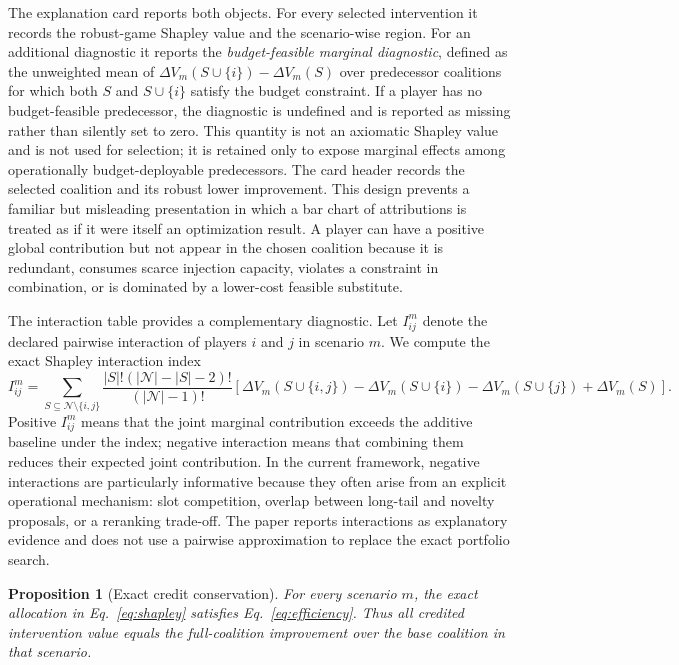 \documentclass[pdflatex,sn-mathphys-num]{sn-jnl}
\theoremstyle{thmstyleone}
\newtheorem{proposition}[theorem]{Proposition}
\theoremstyle{thmstyletwo}
\theoremstyle{thmstylethree}
\newcommand{\Players}{\mathcal{N}}
\newcommand{\Utility}{V}
\begin{document}
The explanation card reports both objects. For every selected intervention it records the robust-game Shapley value and the scenario-wise region. For an additional diagnostic it reports the \emph{budget-feasible marginal diagnostic}, defined as the unweighted mean of $\Delta\Utility_m(S\cup\{i\})-\Delta\Utility_m(S)$ over predecessor coalitions for which both $S$ and $S\cup\{i\}$ satisfy the budget constraint. If a player has no budget-feasible predecessor, the diagnostic is undefined and is reported as missing rather than silently set to zero. This quantity is not an axiomatic Shapley value and is not used for selection; it is retained only to expose marginal effects among operationally budget-deployable predecessors. The card header records the selected coalition and its robust lower improvement. This design prevents a familiar but misleading presentation in which a bar chart of attributions is treated as if it were itself an optimization result. A player can have a positive global contribution but not appear in the chosen coalition because it is redundant, consumes scarce injection capacity, violates a constraint in combination, or is dominated by a lower-cost feasible substitute.

The interaction table provides a complementary diagnostic. Let $I_{ij}^m$ denote the declared pairwise interaction of players $i$ and $j$ in scenario $m$. We compute the exact Shapley interaction index
\begin{equation}
 I_{ij}^m=\sum_{S\subseteq\Players\setminus\{i,j\}}
 \frac{|S|!(|\Players|-|S|-2)!}{(|\Players|-1)!}
 \left[\Delta\Utility_m(S\cup\{i,j\})-\Delta\Utility_m(S\cup\{i\})-\Delta\Utility_m(S\cup\{j\})+\Delta\Utility_m(S)\right].
\label{eq:interaction}
\end{equation}
Positive $I_{ij}^m$ means that the joint marginal contribution exceeds the additive baseline under the index; negative interaction means that combining them reduces their expected joint contribution. In the current framework, negative interactions are particularly informative because they often arise from an explicit operational mechanism: slot competition, overlap between long-tail and novelty proposals, or a reranking trade-off. The paper reports interactions as explanatory evidence and does not use a pairwise approximation to replace the exact portfolio search.

\begin{proposition}[Exact credit conservation]\label{prop:efficiency}
For every scenario $m$, the exact allocation in Eq.~\eqref{eq:shapley} satisfies Eq.~\eqref{eq:efficiency}. Thus all credited intervention value equals the full-coalition improvement over the base coalition in that scenario.
\end{proposition}
\end{document}

